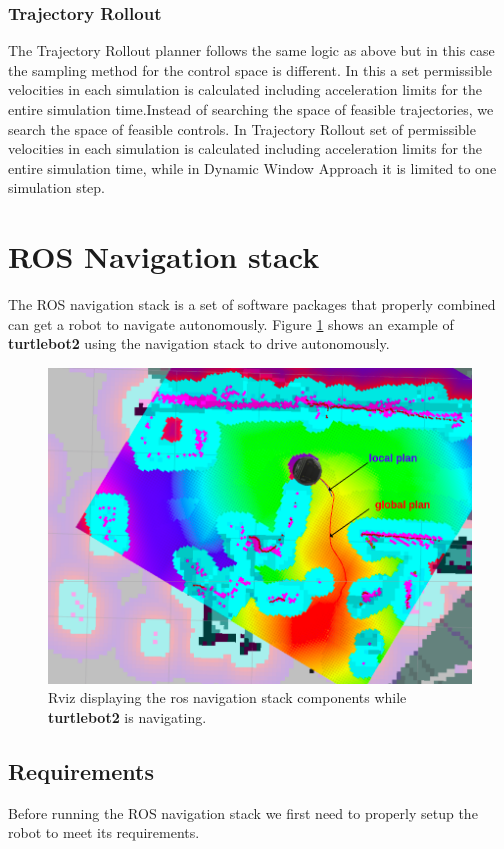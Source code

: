 \subsubsection{Trajectory Rollout} \label{tr}
The Trajectory Rollout planner follows the same logic as above but in this case the sampling method for the control space is different. In this a set permissible velocities
in each simulation is calculated including acceleration limits for the entire simulation time\cite{inbookdwa}.Instead of searching the space of feasible trajectories, we search the space of feasible controls. In Trajectory Rollout set of permissible velocities in each simulation is calculated including acceleration limits for the entire simulation
time, while in Dynamic Window Approach it is limited to one simulation step.
\section {ROS Navigation stack}
The ROS navigation stack is a set of software packages that properly combined can get a robot to navigate autonomously.
Figure \ref{fig:plans} shows an example of \textbf{turtlebot2} using the navigation stack to drive autonomously.
\begin{figure}[!htb]
    \centering
    \includegraphics[width=\linewidth]{imgs/chapter3/nav.png}
    \caption[Rviz view of the ROS Navigation Stack]{Rviz displaying the ros navigation stack components while \textbf{turtlebot2} is navigating.}
    \label{fig:plans}
\end{figure}

\subsection{Requirements}
 Before running the \ac{ROS} navigation stack we first need to properly setup the robot to meet its requirements.
